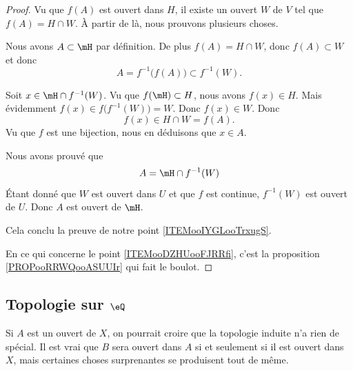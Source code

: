 \begin{proof}
	Vu que \( f(A)\) est ouvert dans \( H\), il existe un ouvert \( W\) de \( V\) tel que \( f(A)=H\cap W\). À partir de là, nous prouvons plusieurs choses.
	\begin{subproof}
		Nous avons \( A\subset\mH\) par définition. De plus \( f(A)=H\cap W\), donc \( f(A)\subset W\) et donc
		\begin{equation}
			A=f^{-1}\big( f(A) \big)\subset f^{-1}(W).
		\end{equation}

		Soit \( x\in \mH\cap f^{-1}(W)\). Vu que \( f(\mH)\subset H\), nous avons \( f(x)\in H\). Mais évidemment \( f(x)\in f\big( f^{-1}(W) \big)=W\). Donc \( f(x)\in W\). Donc
		\begin{equation}
			f(x)\in H\cap W=f(A).
		\end{equation}
		Vu que \( f\) est une bijection, nous en déduisons que \( x\in A\).

		\spitem[Conclusion]
		Nous avons prouvé que
		\begin{equation}
			A= \mH\cap f^{-1}(W)
		\end{equation}
		Étant donné que \( W\) est ouvert dans \( U\) et que \( f\) est continue, \( f^{-1}(W)\) est ouvert de \( U\). Donc \( A\) est ouvert de \( \mH\).

		Cela conclu la preuve de notre point \ref{ITEMooIYGLooTrxugS}.
	\end{subproof}
	En ce qui concerne le point \ref{ITEMooDZHUooFJRRfi}, c'est la proposition \ref{PROPooRRWQooASUUIr} qui fait le boulot.
\end{proof}

\subsection{Topologie sur \( \eQ\)}

Si \( A\) est un ouvert de \( X\), on pourrait croire que la topologie induite n'a rien de spécial. Il est vrai que \( B\) sera ouvert dans \( A\) si et seulement si il est ouvert dans \( X\), mais certaines choses surprenantes se produisent tout de même.

